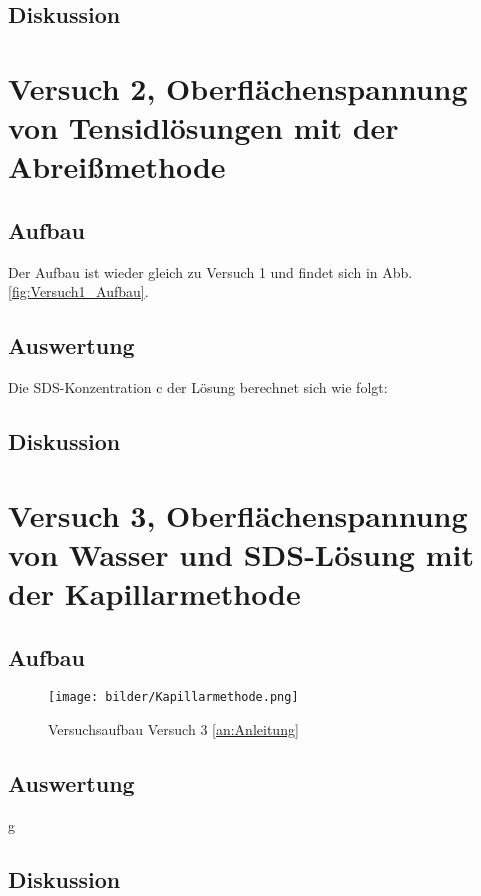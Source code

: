         \subsection{Diskussion}

    \section{Versuch 2, Oberflächenspannung von Tensidlösungen mit der Abreißmethode}

        \subsection{Aufbau}
            Der Aufbau ist wieder gleich zu Versuch 1 und findet sich in Abb. \ref{fig:Versuch1_Aufbau}. 

        \subsection{Auswertung}
            Die SDS-Konzentration $\mathrm{c}$ der Lösung berechnet sich wie folgt:

        
        \subsection{Diskussion}

    \section{Versuch 3, Oberflächenspannung von Wasser und SDS-Lösung mit der Kapillarmethode}

        \subsection{Aufbau}

            \begin{figure}[H]
                \centering
                \texttt{[image: bilder/Kapillarmethode.png]}
                \caption{Versuchsaufbau Versuch 3 \ref{an:Anleitung}}
                \label{fig:Versuch3_Aufbau}
            \end{figure}

        \subsection{Auswertung}
        
        g\subsection{Diskussion}
